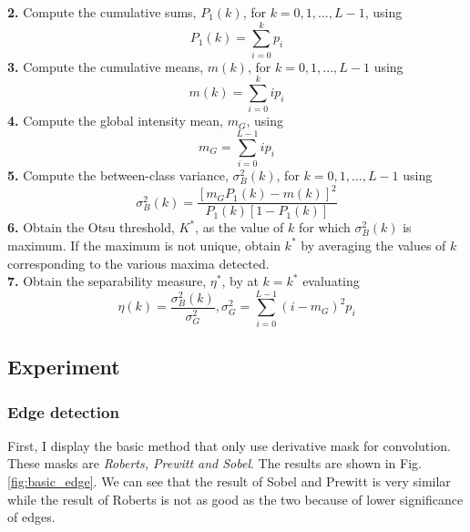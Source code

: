 \textbf{2.} Compute the cumulative sums, $P_1(k)$, for $k=0,1,...,L-1$, using \begin{equation} P_1(k)=\sum_{i=0}^k p_i \end{equation}
\textbf{3.} Compute the cumulative means, $m(k)$, for $k=0,1,...,L-1$ using \begin{equation} m(k)=\sum_{i=0}^k ip_i\end{equation}
\textbf{4.} Compute the global intensity mean, $m_G$, using \begin{equation} m_G=\sum_{i=0}^{L-1}ip_i \end{equation}
\textbf{5.} Compute the between-class variance, $\sigma^2_B(k)$, for $k=0,1,...,L-1$ using \begin{equation} \sigma_B^2(k)=\frac{[m_GP_1(k)-m(k)]^2}{P_1(k)[1-P_1(k)]}\end{equation}
\textbf{6.} Obtain the Otsu threshold, $K^*$, as the value of $k$ for which $\sigma_B^2(k)$ is maximum. If the maximum is not unique, obtain $k^*$ by averaging the values of $k$ corresponding to the various maxima detected. \\
\textbf{7.} Obtain the separability measure, $\eta ^ *$, by at $k=k^*$ evaluating \begin{equation} \eta(k)=\frac{\sigma_B^2(k)}{\sigma_G^2}, \sigma_G^2=\sum_{i=0}^{L-1}(i-m_G)^2p_i \end{equation} 

\subsection{Experiment}
\subsubsection{Edge detection}
First, I display the basic method that only use derivative mask for convolution. These masks are \emph{Roberts, Prewitt and Sobel}. The results are shown in Fig.\ref{fig:basic_edge}. We can see that the result of Sobel and Prewitt is very similar while the result of Roberts is not as good as the two because of lower significance of edges.\\

